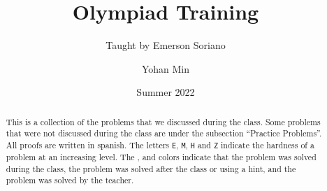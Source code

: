 \documentclass[11pt]{scrartcl}
\title{Olympiad Training}
\subtitle{Taught by Emerson Soriano}
\author{Yohan Min}
\date{Summer 2022}
\begin{document}
\maketitle

\begin{abstract}
	This is a collection of the problems that we discussed during the class. Some problems that were not discussed during the class are under the subsection ``Practice Problems''. All proofs are written in spanish. The letters \verb|E|, \verb|M|, \verb|H| and \verb|Z| indicate the hardness of a problem at an increasing level. The ,  and  colors indicate that the problem was solved during the class, the problem was solved after the class or using a hint, and the problem was solved by the teacher.
\end{abstract}

\tableofcontents





\end{document}
